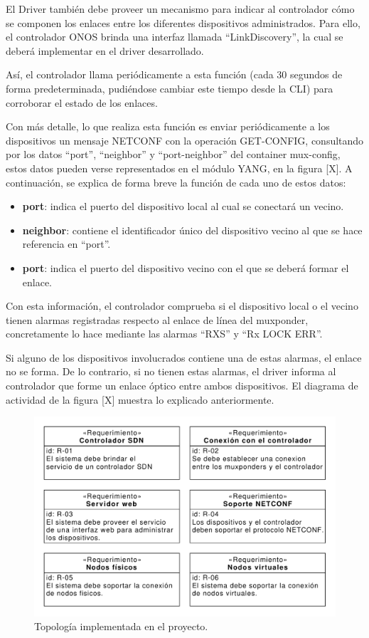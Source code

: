 El Driver también debe proveer un mecanismo para indicar al controlador cómo se componen los enlaces entre los diferentes dispositivos administrados. Para ello, el controlador ONOS brinda una interfaz llamada “LinkDiscovery”, la cual se deberá implementar en el driver desarrollado. 

Así, el controlador llama periódicamente a esta función (cada 30 segundos de forma predeterminada, pudiéndose cambiar este tiempo desde la CLI) para corroborar el estado de los enlaces. 

Con más detalle, lo que realiza esta función es enviar periódicamente a los dispositivos un mensaje NETCONF con la operación GET-CONFIG, consultando por los datos “port”, “neighbor” y “port-neighbor” del container mux-config, estos datos pueden verse representados en el módulo YANG, en la figura [X]. A continuación, se explica de forma breve la función de cada uno de estos datos:

\begin{itemize}
	\item \textbf{port}: indica el puerto del dispositivo local al cual se conectará un vecino.
    
    \item \textbf{neighbor}: contiene el identificador único del dispositivo vecino al que se hace referencia en “port”.
    
    \item \textbf{port}: indica el puerto del dispositivo vecino con el que se deberá formar el enlace.
\end{itemize}

Con esta información, el controlador comprueba si el dispositivo local o el vecino tienen alarmas registradas respecto al enlace de línea del muxponder, concretamente lo hace mediante las alarmas “RXS” y “Rx LOCK ERR”. 

Si alguno de los dispositivos involucrados contiene una de estas alarmas, el enlace no se forma. De lo contrario, si no tienen estas alarmas, el driver informa al controlador que forme un enlace óptico entre ambos dispositivos. El diagrama de actividad de la figura [X] muestra lo explicado anteriormente.

\begin{figure}[H]
    \centering
    \includegraphics[scale=0.65]{Figures/req_sys.pdf}
    \caption{Topología implementada en el proyecto.}
    \label{fig:req_sys}
  \end{figure}

